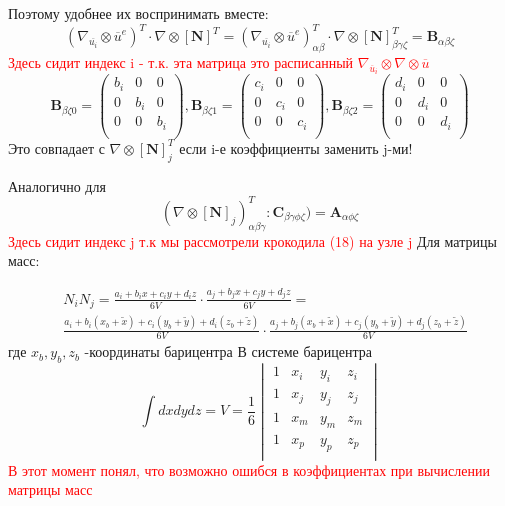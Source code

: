\documentclass[a4paper,12pt]{article}
\begin{document}
Поэтому удобнее их воспринимать вместе:
\begin{equation}
    (\nabla_{\overline{u_i}} \otimes \overline{u}^e)^T \cdot \nabla \otimes [\textbf{N}]^T = (\nabla_{\overline{u_i}} \otimes \overline{u}^e)^T_{\alpha \beta} \cdot \nabla \otimes [\textbf{N}]^T_{\beta \gamma \zeta} = \textbf{B}_{\alpha \beta \zeta}
\end{equation}
\textcolor{red}{Здесь сидит индекс i - т.к. эта матрица это расписанный $\nabla_{\overline{u}_i} \otimes  \nabla \otimes \overline{u}$}
\begin{equation}
    \textbf{B}_{\beta \zeta 0} = 
\begin{pmatrix}
b_i & 0   & 0   \\
0   & b_i & 0   \\
0   & 0   & b_i \\
\end{pmatrix},  \textbf{B}_{\beta \zeta 1} = 
\begin{pmatrix}
c_i & 0   & 0   \\
0   & c_i & 0   \\
0   & 0   & c_i \\
\end{pmatrix}, \textbf{B}_{\beta\zeta 2} = 
\begin{pmatrix}
d_i & 0   & 0   \\
0   & d_i & 0   \\
0   & 0   & d_i \\
\end{pmatrix}
\end{equation}
Это совпадает с $\nabla \otimes [\textbf{N}]^T_j$ если i-е коэффициенты заменить j-ми! \par
Аналогично для 
\begin{equation}
    (\nabla \otimes[\textbf{N}]_j)_{\alpha \beta \gamma}^T:\textbf{C}_{\beta \gamma \phi \zeta}) = \textbf{A}_{\alpha \phi \zeta}
\end{equation}
\textcolor{red}{ Здесь сидит индекс j т.к мы рассмотрели крокодила (18) на узле j}
Для матрицы масс: \par
\begin{align}
    & N_i N_j= \frac{a_i + b_i x + c_i y + d_i z}{6V} \cdot  \frac{a_j + b_j x + c_j y + d_j z}{6V} = \\
    &\frac{a_i + b_i (x_b + \tilde{x}) + c_i (y_b + \tilde{y}) + d_i (z_b + \tilde{z})}{6V} \cdot  \frac{a_j + b_j (x_b + \tilde{x}) + c_j (y_b + \tilde{y}) + d_j (z_b + \tilde{z})}{6V}
\end{align}
где $x_b,y_b,z_b$ -координаты барицентра
В системе барицентра
\begin{equation}
    \int dxdydz = V = \frac{1}{6}     \begin{vmatrix}
1 & x_i & y_i & z_i \\ 
1 & x_j & y_j & z_j \\ 
1 & x_m & y_m & z_m \\ 
1 & x_p & y_p & z_p \\
    \end{vmatrix} 
\end{equation}
\textcolor{red}{В этот момент понял, что возможно ошибся в коэффициентах при вычислении матрицы масс}
\end{document}
